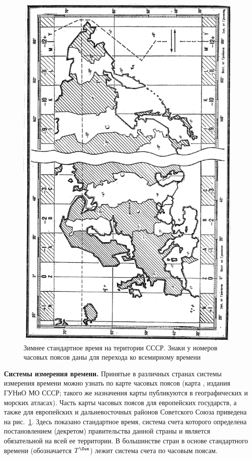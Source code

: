 \documentclass[a4paper, 12pt, twoside, final, book, russian, fittopage, cyremdash]{ncc}
\newcommand{\ris}[1]{\ref{fig:#1}}
\newcommand{\TSun}{\ensuremath{T^{\text{\Sun}}}}
\begin{document}
\begin{figure}[htb]
  \centering{}
  \includegraphics{0090P}
  \caption{Зимнее стандартное время на територии СССР. Знаки у номеров часовых поясов даны для перехода ко всемирному времени}
  \label{fig:90}
\end{figure}

\textbf{Системы измерения времени.} Принятые в различных странах системы измерения времени можно узнать по карте часовых поясов (карта , издания ГУНиО МО СССР; такого же назначения карты публикуются в географических и морских атласах). Часть карты часовых поясов для европейских государств, а также для европейских и дальневосточных районов Советского Союза приведена на рис.~\ris{90}. Здесь показано стандартное время, система счета которого определена постановлением (декретом) правительства данной страны и является обязательной на всей ее территории. В большинстве стран в основе стандартного времени (обозначается \TSun) лежит система счета по часовым поясам.
\end{document}
